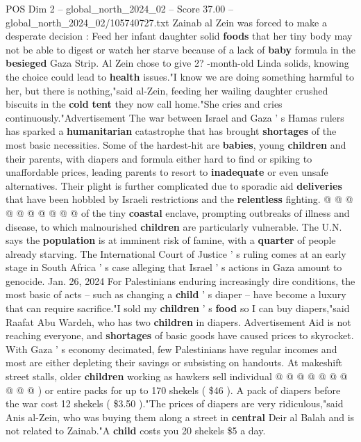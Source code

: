 \begin{textsample}{POS Dim 2 – global\_north\_2024\_02 – Score 37.00 – global\_north\_2024\_02/105740727.txt}  \label{ex:f2_pos_141}
Zainab al Zein was forced to make a desperate decision : Feed her infant daughter solid \textbf{foods} that her tiny body may not be able to digest or watch her starve because of a lack of \textbf{baby} formula in the \textbf{besieged} Gaza Strip.
Al Zein chose to give 2? -month-old Linda solids, knowing the choice could lead to \textbf{health} issues."I know we are doing something harmful to her, but there is nothing,"said al-Zein, feeding her wailing daughter crushed biscuits in the \textbf{cold} \textbf{tent} they now call home."She cries and cries continuously."Advertisement The war between Israel and Gaza ' s Hamas rulers has sparked a \textbf{humanitarian} catastrophe that has brought \textbf{shortages} of the most basic necessities.
Some of the hardest-hit are \textbf{babies}, young \textbf{children} and their parents, with diapers and formula either hard to find or spiking to unaffordable prices, leading parents to resort to \textbf{inadequate} or even unsafe alternatives.
Their plight is further complicated due to sporadic aid \textbf{deliveries} that have been hobbled by Israeli restrictions and the \textbf{relentless} fighting. @ @ @ @ @ @ @ @ @ @ of the tiny \textbf{coastal} enclave, prompting outbreaks of illness and disease, to which malnourished \textbf{children} are particularly vulnerable.
The U.N. says the \textbf{population} is at imminent risk of famine, with a \textbf{quarter} of people already starving.
The International Court of Justice ' s ruling comes at an early stage in South Africa ' s case alleging that Israel ' s actions in Gaza amount to genocide.
Jan. 26, 2024 For Palestinians enduring increasingly dire conditions, the most basic of acts -- such as changing a \textbf{child} ' s diaper -- have become a luxury that can require sacrifice."I sold my \textbf{children} ' s \textbf{food} so I can buy diapers,"said Raafat Abu Wardeh, who has two \textbf{children} in diapers.
Advertisement Aid is not reaching everyone, and \textbf{shortages} of basic goods have caused prices to skyrocket.
With Gaza ' s economy decimated, few Palestinians have regular incomes and most are either depleting their savings or subsisting on handouts.
At makeshift street stalls, older \textbf{children} working as hawkers sell individual @ @ @ @ @ @ @ @ @ @ ) or entire packs for up to 170 shekels ( \$46 ).
A pack of diapers before the war cost 12 shekels ( \$3.50 )."The prices of diapers are very ridiculous,"said Anis al-Zein, who was buying them along a street in \textbf{central} Deir al Balah and is not related to Zainab."A \textbf{child} costs you 20 shekels \$5 a day.

\end{textsample}
